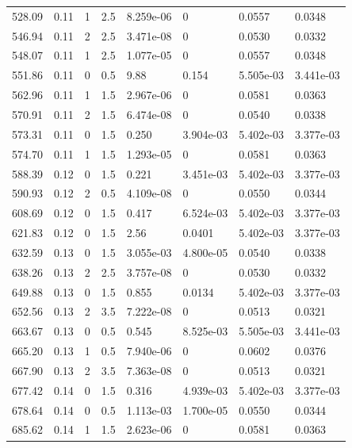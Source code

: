 \documentclass[preview]{standalone}
\begin{document}
{{{\begin{tabular}{L{1.2cm}C{1.2cm} C{0.3cm}C{0.5cm} C{1.4cm}C{1.4cm} C{1.4cm}C{1.4cm}}
  528.09  &  0.11  & 1     & 2.5 &  8.259e-06  & 0  & 0.0557 &  0.0348   \\ 
  546.94  &  0.11  & 2     & 2.5 &  3.471e-08  & 0  & 0.0530 &  0.0332   \\ 
  548.07  &  0.11  & 1     & 2.5 &  1.077e-05  & 0  & 0.0557 &  0.0348   \\ 
  551.86  &  0.11  & 0     & 0.5 &  9.88  & 0.154  & 5.505e-03 &  3.441e-03   \\ 
  562.96  &  0.11  & 1     & 1.5 &  2.967e-06  & 0  & 0.0581 &  0.0363   \\ 
  570.91  &  0.11  & 2     & 1.5 &  6.474e-08  & 0  & 0.0540 &  0.0338   \\ 
  573.31  &  0.11  & 0     & 1.5 &  0.250  & 3.904e-03  & 5.402e-03 &  3.377e-03   \\ 
  574.70  &  0.11  & 1     & 1.5 &  1.293e-05  & 0  & 0.0581 &  0.0363   \\ 
  588.39  &  0.12  & 0     & 1.5 &  0.221  & 3.451e-03  & 5.402e-03 &  3.377e-03   \\ 
  590.93  &  0.12  & 2     & 0.5 &  4.109e-08  & 0  & 0.0550 &  0.0344   \\ 
  608.69  &  0.12  & 0     & 1.5 &  0.417  & 6.524e-03  & 5.402e-03 &  3.377e-03   \\ 
  621.83  &  0.12  & 0     & 1.5 &  2.56  & 0.0401  & 5.402e-03 &  3.377e-03   \\ 
  632.59  &  0.13  & 0     & 1.5 &  3.055e-03  & 4.800e-05  & 0.0540 &  0.0338   \\ 
  638.26  &  0.13  & 2     & 2.5 &  3.757e-08  & 0  & 0.0530 &  0.0332   \\ 
  649.88  &  0.13  & 0     & 1.5 &  0.855  & 0.0134  & 5.402e-03 &  3.377e-03   \\ 
  652.56  &  0.13  & 2     & 3.5 &  7.222e-08  & 0  & 0.0513 &  0.0321   \\ 
  663.67  &  0.13  & 0     & 0.5 &  0.545  & 8.525e-03  & 5.505e-03 &  3.441e-03   \\ 
  665.20  &  0.13  & 1     & 0.5 &  7.940e-06  & 0  & 0.0602 &  0.0376   \\ 
  667.90  &  0.13  & 2     & 3.5 &  7.363e-08  & 0  & 0.0513 &  0.0321   \\ 
  677.42  &  0.14  & 0     & 1.5 &  0.316  & 4.939e-03  & 5.402e-03 &  3.377e-03   \\ 
  678.64  &  0.14  & 0     & 0.5 &  1.113e-03  & 1.700e-05  & 0.0550 &  0.0344   \\ 
  685.62  &  0.14  & 1     & 1.5 &  2.623e-06  & 0  & 0.0581 &  0.0363   \\ 

\end{tabular}}}}
\end{document}
